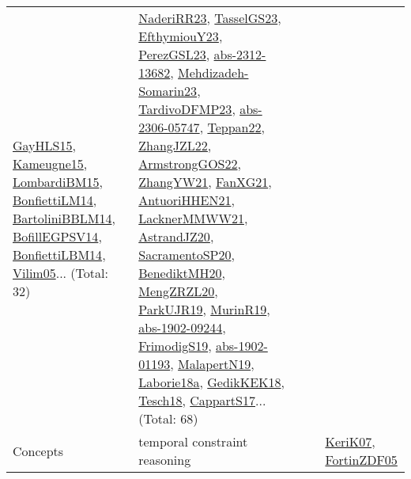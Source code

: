 {\begin{longtable}{lp{3cm}>{\raggedright}p{6cm}>{\raggedright}p{6cm}p{8cm}}
\href{papers/GayHLS15.pdf}{GayHLS15}\cite{GayHLS15}, \href{articles/Kameugne15.pdf}{Kameugne15}\cite{Kameugne15}, \href{papers/LombardiBM15.pdf}{LombardiBM15}\cite{LombardiBM15}, \href{papers/BonfiettiLM14.pdf}{BonfiettiLM14}\cite{BonfiettiLM14}, \href{papers/BartoliniBBLM14.pdf}{BartoliniBBLM14}\cite{BartoliniBBLM14}, \href{papers/BofillEGPSV14.pdf}{BofillEGPSV14}\cite{BofillEGPSV14}, \href{articles/BonfiettiLBM14.pdf}{BonfiettiLBM14}\cite{BonfiettiLBM14}, \href{papers/Vilim05.pdf}{Vilim05}\cite{Vilim05}... (Total: 32) & \href{articles/NaderiRR23.pdf}{NaderiRR23}\cite{NaderiRR23}, \href{papers/TasselGS23.pdf}{TasselGS23}\cite{TasselGS23}, \href{papers/EfthymiouY23.pdf}{EfthymiouY23}\cite{EfthymiouY23}, \href{papers/PerezGSL23.pdf}{PerezGSL23}\cite{PerezGSL23}, \href{articles/abs-2312-13682.pdf}{abs-2312-13682}\cite{abs-2312-13682}, \href{papers/Mehdizadeh-Somarin23.pdf}{Mehdizadeh-Somarin23}\cite{Mehdizadeh-Somarin23}, \href{papers/TardivoDFMP23.pdf}{TardivoDFMP23}\cite{TardivoDFMP23}, \href{articles/abs-2306-05747.pdf}{abs-2306-05747}\cite{abs-2306-05747}, \href{papers/Teppan22.pdf}{Teppan22}\cite{Teppan22}, \href{papers/ZhangJZL22.pdf}{ZhangJZL22}\cite{ZhangJZL22}, \href{papers/ArmstrongGOS22.pdf}{ArmstrongGOS22}\cite{ArmstrongGOS22}, \href{articles/ZhangYW21.pdf}{ZhangYW21}\cite{ZhangYW21}, \href{articles/FanXG21.pdf}{FanXG21}\cite{FanXG21}, \href{papers/AntuoriHHEN21.pdf}{AntuoriHHEN21}\cite{AntuoriHHEN21}, \href{papers/LacknerMMWW21.pdf}{LacknerMMWW21}\cite{LacknerMMWW21}, \href{articles/AstrandJZ20.pdf}{AstrandJZ20}\cite{AstrandJZ20}, \href{articles/SacramentoSP20.pdf}{SacramentoSP20}\cite{SacramentoSP20}, \href{articles/BenediktMH20.pdf}{BenediktMH20}\cite{BenediktMH20}, \href{articles/MengZRZL20.pdf}{MengZRZL20}\cite{MengZRZL20}, \href{papers/ParkUJR19.pdf}{ParkUJR19}\cite{ParkUJR19}, \href{papers/MurinR19.pdf}{MurinR19}\cite{MurinR19}, \href{articles/abs-1902-09244.pdf}{abs-1902-09244}\cite{abs-1902-09244}, \href{papers/FrimodigS19.pdf}{FrimodigS19}\cite{FrimodigS19}, \href{articles/abs-1902-01193.pdf}{abs-1902-01193}\cite{abs-1902-01193}, \href{papers/MalapertN19.pdf}{MalapertN19}\cite{MalapertN19}, \href{papers/Laborie18a.pdf}{Laborie18a}\cite{Laborie18a}, \href{articles/GedikKEK18.pdf}{GedikKEK18}\cite{GedikKEK18}, \href{papers/Tesch18.pdf}{Tesch18}\cite{Tesch18}, \href{papers/CappartS17.pdf}{CappartS17}\cite{CappartS17}... (Total: 68)\\
Concepts & temporal constraint reasoning &  &  & \href{papers/KeriK07.pdf}{KeriK07}\cite{KeriK07}, \href{papers/FortinZDF05.pdf}{FortinZDF05}\cite{FortinZDF05}\\

\end{longtable}}
